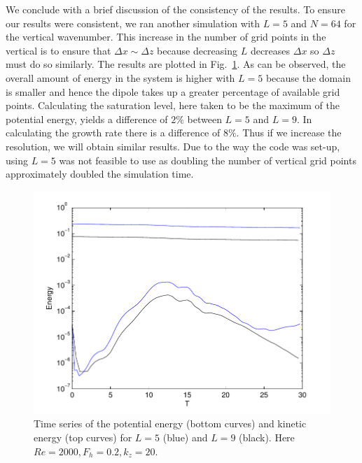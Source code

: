 We conclude with a brief discussion of the consistency of the results. To ensure our results were consistent, we ran another simulation with $L=5$ and $N=64$ for the vertical wavenumber. This increase in the number of grid points in the vertical is to ensure that $\Delta x \sim \Delta z$ because decreasing $L$ decreases $\Delta x$ so $\Delta z$ must do so similarly. The results are plotted in Fig.~\ref{test_energy}. As can be observed, the overall amount of energy in the system is higher with $L=5$ because the domain is smaller and hence the dipole takes up a greater percentage of available grid points. Calculating the saturation level, here taken to be the maximum of the potential energy, yields a difference of $2\%$ between $L=5$ and $L=9$. In calculating the growth rate there is a difference of $8\%$. Thus if we increase the resolution, we will obtain similar results. Due to the way the code was set-up, using $L=5$ was not feasible to use as doubling the number of vertical grid points approximately doubled the simulation time. 
\begin{figure}
\begin{center}
\includegraphics[width=\textwidth]{energy_test}
\caption{Time series of the potential energy (bottom curves) and kinetic energy (top curves) for $L=5$ (blue) and $L=9$ (black). Here $Re=2000, F_{h}=0.2,k_{z}=20$.}
\label{test_energy}
\end{center}
\end{figure}





